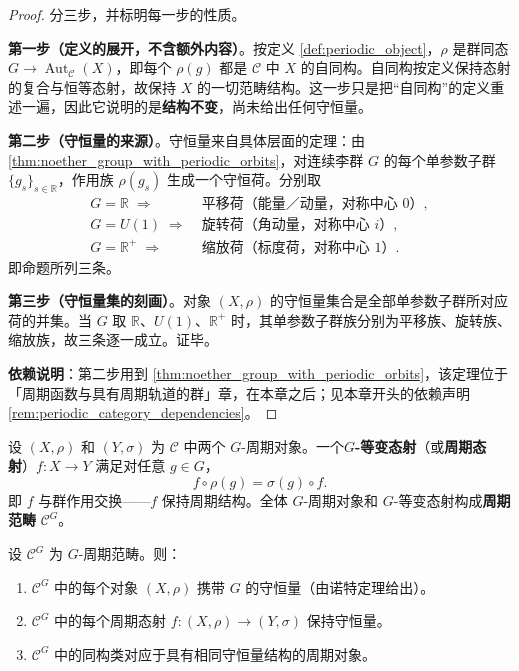 \begin{proof}
分三步，并标明每一步的性质。

\textbf{第一步（定义的展开，不含额外内容）}。按定义 \ref{def:periodic_object}，$\rho$ 是群同态 $G \to \operatorname{Aut}_{\mathcal{C}}(X)$，即每个 $\rho(g)$ 都是 $\mathcal{C}$ 中 $X$ 的自同构。自同构按定义保持态射的复合与恒等态射，故保持 $X$ 的一切范畴结构。这一步只是把“自同构”的定义重述一遍，因此它说明的是\textbf{结构不变}，尚未给出任何守恒量。

\textbf{第二步（守恒量的来源）}。守恒量来自具体层面的定理：由 \cref{thm:noether_group_with_periodic_orbits}，对连续李群 $G$ 的每个单参数子群 $\{g_s\}_{s \in \mathbb{R}}$，作用族 $\rho(g_s)$ 生成一个守恒荷。分别取
\[
\begin{aligned}
G = \mathbb{R} \;\Rightarrow\; &\text{平移荷（能量／动量，对称中心 } 0\text{）},\\
G = U(1) \;\Rightarrow\; &\text{旋转荷（角动量，对称中心 } i\text{）},\\
G = \mathbb{R}^+ \;\Rightarrow\; &\text{缩放荷（标度荷，对称中心 } 1\text{）}.
\end{aligned}
\]
即命题所列三条。

\textbf{第三步（守恒量集的刻画）}。对象 $(X, \rho)$ 的守恒量集合是全部单参数子群所对应荷的并集。当 $G$ 取 $\mathbb{R}$、$U(1)$、$\mathbb{R}^+$ 时，其单参数子群族分别为平移族、旋转族、缩放族，故三条逐一成立。证毕。

\textbf{依赖说明}：第二步用到 \cref{thm:noether_group_with_periodic_orbits}，该定理位于「周期函数与具有周期轨道的群」章，在本章之后；见本章开头的依赖声明 \cref{rem:periodic_category_dependencies}。
\end{proof}

\begin{definition}[周期态射]\label{def:periodic_morphism}
设 $(X, \rho)$ 和 $(Y, \sigma)$ 为 $\mathcal{C}$ 中两个 $G$-周期对象。一个\textbf{$G$-等变态射}（或\textbf{周期态射}）$f: X \to Y$ 满足对任意 $g \in G$，
\[
f \circ \rho(g) = \sigma(g) \circ f.
\]
即 $f$ 与群作用交换——$f$ 保持周期结构。全体 $G$-周期对象和 $G$-等变态射构成\textbf{周期范畴} $\mathcal{C}^G$。
\end{definition}

\begin{theorem}[周期范畴的守恒律保持]\label{thm:periodic_category_conservation}
设 $\mathcal{C}^G$ 为 $G$-周期范畴。则：
\begin{enumerate}[label=(\roman*)]
    \item $\mathcal{C}^G$ 中的每个对象 $(X, \rho)$ 携带 $G$ 的守恒量（由诺特定理给出）。
    \item $\mathcal{C}^G$ 中的每个周期态射 $f: (X, \rho) \to (Y, \sigma)$ 保持守恒量。
    \item $\mathcal{C}^G$ 中的同构类对应于具有相同守恒量结构的周期对象。
\end{enumerate}
\end{theorem}

